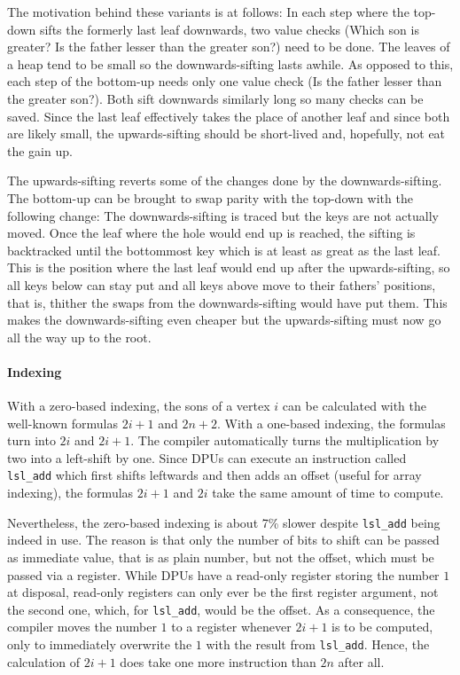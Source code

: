 The motivation behind these variants is at follows:
In each step where the top-down \HS{} sifts the formerly last leaf downwards, two value checks (Which son is greater? Is the father lesser than the greater son?) need to be done.
The leaves of a heap tend to be small so the downwards-sifting lasts awhile.
As opposed to this, each step of the bottom-up \HS{} needs only one value check (Is the father lesser than the greater son?).
Both \HS*{} sift downwards similarly long so many checks can be saved.
Since the last leaf effectively takes the place of another leaf and since both are likely small, the upwards-sifting should be short-lived and, hopefully, not eat the gain up.

The upwards-sifting reverts some of the changes done by the downwards-sifting.
The bottom-up \HS{} can be brought to swap parity with the top-down \HS{} with the following change:
The downwards-sifting is traced but the keys are not actually moved.
Once the leaf where the hole would end up is reached, the sifting is backtracked until the bottommost key which is at least as great as the last leaf.
This is the position where the last leaf would end up after the upwards-sifting, so all keys below can stay put and all keys above move to their fathers' positions, that is, thither the swaps from the downwards-sifting would have put them.
This makes the downwards-sifting even cheaper but the upwards-sifting must now go all the way up to the root.

\paragraph{Indexing}
With a zero-based indexing, the sons of a vertex \(i\) can be calculated with the well-known formulas \(2i + 1\) and \(2n + 2\).
With a one-based indexing, the formulas turn into \(2i\) and \(2i + 1\).
The compiler automatically turns the multiplication by two into a left-shift by one.
Since DPUs can execute an instruction called \lstinline|lsl_add| which first shifts leftwards and then adds an offset (useful \eg{} for array indexing), the formulas \(2i + 1\) and \(2i\) take the same amount of time to compute.

Nevertheless, the zero-based indexing is about 7\% slower despite \lstinline|lsl_add| being indeed in use.
The reason is that only the number of bits to shift can be passed as immediate value, that is as plain number, but not the offset, which must be passed via a register.
While DPUs have a read-only register storing the number \(1\) at disposal, read-only registers can only ever be the first register argument, not the second one, which, for \lstinline|lsl_add|, would be the offset.
As a consequence, the compiler moves the number \(1\) to a register whenever \(2i + 1\) is to be computed, only to immediately overwrite the \(1\) with the result from \lstinline|lsl_add|.
Hence, the calculation of \(2i + 1\) does take one more instruction than \(2n\) after all.

